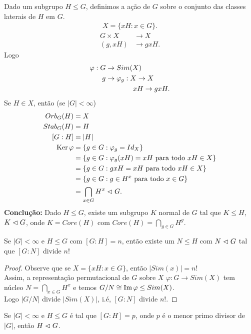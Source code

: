 \begin{example}
  Dado um subgrupo $H\leq G$, definimos a ação de $G$ sobre o conjunto das classes laterais de $H$ em $G$.
  \begin{align*}
    X=\{xH:x\in G\}.
  \end{align*}
  \begin{align*}
    G\times X&\to X\\
    (g,xH)&\to gxH.
  \end{align*}
  Logo
  \begin{align*}
    \varphi: G&\to Sim(X)\\
    g&\to \varphi_g:X\to X\\
    \phantom{g}&\phantom{\to \varphi_g:}\hspace{0.34cm}xH\to gxH.    
  \end{align*}
  Se $H\in X$, então (se $|G|<\infty$)
  \begin{align*}
    Orb_{G}(H)&=X\\
    Stab_{G}(H)&=H\\
    [G:H]&=|H|\\
    \operatorname{Ker}\varphi&=\{g\in G:\varphi_g=Id_X\}\\
    &=\{g\in G:\varphi_g(xH)=xH\text{ para todo }xH\in X\}\\
    &=\{g\in G:gxH=xH\text{ para todo }xH\in X\}\\
    &=\{g\in G:g\in H^{x}\text{ para todo }x\in G\}\\
    &=\bigcap_{x\in G}H^{x}\vartriangleleft G.
  \end{align*}
  \textbf{Conclução:} Dado $H\leq G$, existe um subgrupo $K$ normal de $G$ tal que $K\leq H$, $K\vartriangleleft G$, onde $K=Core(H)$ com $\displaystyle Core(H)=\bigcap_{g\in G}H^{g}$. 
\end{example}
\begin{proposition}
  Se $|G|<\infty$ e $H\leq G$ com $[G:H]=n$, então existe um $N\leq H$ com $N\vartriangleleft G$ tal que $[G:N]$ divide $n!$ 
\end{proposition}
\begin{proof} 
  Observe que se $X=\{xH:x\in G\}$, então $|Sim(x)|=n!$\\
  Assim, a representação permutacional de $G$ sobre $X$ $\varphi:G\to Sim(X)$ tem núcleo $\displaystyle N=\bigcap_{x\in G}H^{x}$ e temos $G/N\cong \operatorname{Im}\varphi\leq Sim(X)$.\\
  Logo $|G/N|$ divide $|Sim(X)|$, i.é, $[G:N]$ divide $n!$. 
\end{proof}
\begin{corollary}
  Se $|G|<\infty$ e $H\leq G$ é tal que $[G:H]=p$, onde $p$ é o menor primo divisor de $|G|$, então $H\vartriangleleft G$. 
\end{corollary}
